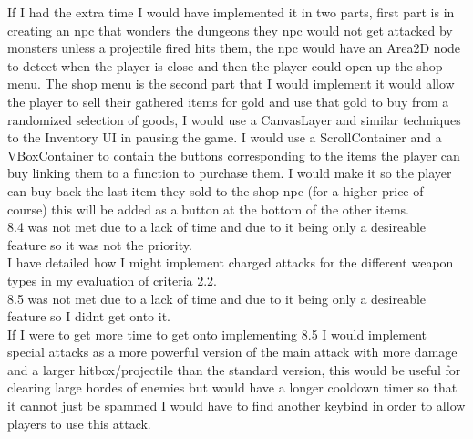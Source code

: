 \documentclass{article}
\begin{document}
        If I had the extra time I would have implemented it in two parts, first part is in creating an npc that wonders the dungeons they npc would not get attacked by monsters unless a projectile fired hits them, the npc would have an Area2D node to detect when the player is close and then the player could open up the shop menu. The shop menu is the second part that I would implement it would allow the player to sell their gathered items for gold and use that gold to buy from a randomized selection of goods, I would use a CanvasLayer and similar techniques to the Inventory UI in pausing the game. I would use a ScrollContainer and a VBoxContainer to contain the buttons corresponding to the items the player can buy linking them to a function to purchase them. I would make it so the player can buy back the last item they sold to the shop npc (for a higher price of course) this will be added as a button at the bottom of the other items.\\
        8.4 was not met due to a lack of time and due to it being only a desireable feature so it was not the priority.\\
        I have detailed how I might implement charged attacks for the different weapon types in my evaluation of criteria 2.2.\\
        8.5 was not met due to a lack of time and due to it being only a desireable feature so I didnt get onto it.\\
        If I were to get more time to get onto implementing 8.5 I would implement special attacks as a more powerful version of the main attack with more damage and a larger hitbox/projectile than the standard version, this would be useful for clearing large hordes of enemies but would have a longer cooldown timer so that it cannot just be spammed I would have to find another keybind in order to allow players to use this attack.\\
\end{document}
